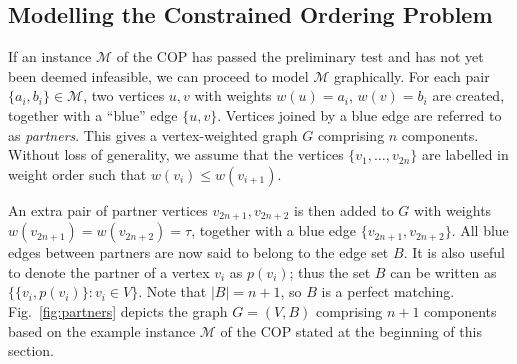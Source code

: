 \documentclass[a4paper,11pt,authoryear]{elsarticle}
\begin{document}

\subsection{Modelling the Constrained Ordering Problem}
\label{sub:modelcop}

\noindent If an instance $\mathcal{M}$ of the COP has passed the preliminary test and has not yet been deemed infeasible, we can proceed to model $\mathcal{M}$ graphically. For each pair $\{a_i, b_i\} \in \mathcal{M}$, two vertices $u, v$ with weights $w(u) = a_i$, $w(v) = b_i$ are created, together with a ``blue'' edge $\{u, v\}$. Vertices joined by a blue edge are referred to as \textit{partners}. This gives a vertex-weighted graph $G$ comprising $n$ components. Without loss of generality, we assume that the vertices $\{v_1,\dotsc,v_{2n}\}$ are labelled in weight order such that $w(v_i) \leq w(v_{i+1})$.

An extra pair of partner vertices $v_{2n+1}, v_{2n+2}$ is then added to $G$ with weights $w(v_{2n+1}) = w(v_{2n+2}) = \tau$, together with a blue edge $\{v_{2n+1}, v_{2n+2}\}$. All blue edges between partners are now said to belong to the edge set $B$. It is also useful to denote the partner of a vertex $v_i$ as $p(v_i)$; thus the set $B$ can be written as $\{\{v_i, p(v_i)\} : v_i \in V\}$. Note that $|B| = n+1$, so $B$ is a perfect matching. Fig.~\ref{fig:partners} depicts the graph $G=(V, B)$ comprising $n+1$ components based on the example instance $\mathcal{M}$ of the COP stated at the beginning of this section. 

\end{document}
